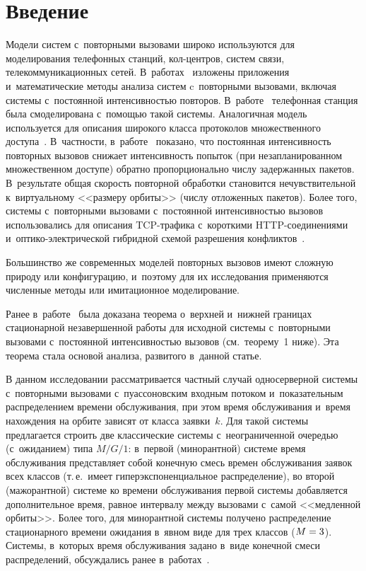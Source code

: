 \begin{multicols}{2}

\label{st\stat}

\section{Введение}

Модели систем с~повторными вызовами широко используются для моделирования  
телефонных станций, кол-цент\-ров, сис\-тем связи, телекоммуникационных сетей. 
В~работах~\cite{Ar1, Ar3} \mbox{изложены}  приложения и~математические методы анализа 
сис\-тем c~повторными вызовами, включая сис\-те\-мы с~постоянной интенсивностью 
повторов. В~работе~\cite{F86}   телефонная станция была смоделирована  с~по\-мощью 
такой сис\-те\-мы. Аналогичная модель используется для описания широкого класса 
протоколов множественного доступа~\cite {CSA92, CRP93}. В~част\-ности, в~работе~\cite{BG92} 
показано, что постоянная интенсивность повторных вызовов  снижает 
интенсивность попыток (при незапланированном множественном доступе) обратно 
пропорционально числу задержанных пакетов. В~результате общая ско\-рость повторной 
обработки становится нечувствительной к~виртуальному <<размеру орбиты>> (числу 
отложенных пакетов). Более того, сис\-те\-мы с~повторными вызовами с~постоянной 
интенсивностью вызовов использовались для описания TCP-тра\-фи\-ка с~короткими HTTP-со\-еди\-не\-ни\-ями~\cite{AY08,AY10} 
и~оп\-ти\-ко-элект\-ри\-че\-ской гиб\-рид\-ной схемой разрешения 
конфликтов~\cite{Wongetal09,Yaoetal02}.

 Большинство же современных моделей повторных вызовов имеют сложную природу или 
конфигурацию, и~поэтому для их исследования применяются численные методы или 
имитационное моделирование.

Ранее в~работе~\cite{mathematics2022} была доказана тео\-ре\-ма о~верх\-ней и~ниж\-ней 
границах стационарной незавершенной работы  для исходной сис\-те\-мы с~повторными 
вызовами с~постоянной интенсивностью вызовов  (см.\ тео\-ре\-му~1 ниже). Эта тео\-ре\-ма 
стала основой анализа, развитого в~данной \mbox{статье}.

В данном исследовании рассматривается частный случай  односерверной сис\-те\-мы  
с~повторными вызовами с~пуассоновским входным потоком и~показательным 
распределением времени обслуживания, при этом  время обслуживания  и~время 
нахождения на орбите зависят от класса заявки~$k$.
%
Для такой системы предлагается строить две классические сис\-те\-мы с~неограниченной 
очередью (с~ожиданием) типа $M/G/1$: в~первой (минорантной) сис\-те\-ме время 
обслуживания пред\-став\-ля\-ет собой конечную смесь времен обслуживания заявок всех 
классов (т.\,е.\ имеет гиперэкспоненциальное распределение), во второй 
(мажорантной) сис\-те\-ме ко времени обслуживания первой сис\-те\-мы добавляется 
дополнительное время, равное  интервалу между вызовами  с~самой <<медленной 
орбиты>>.   Более того, для минорантной сис\-те\-мы получено распределение 
стационарного времени ожидания в~явном виде для трех классов ($M\hm=3$).
Сис\-те\-мы, в~которых  время обслуживания задано в~виде конечной смеси 
распределений, обсуждались ранее  в~работах~\cite{pesh-mor2022, pesh2022}.
 

\end{multicols}
